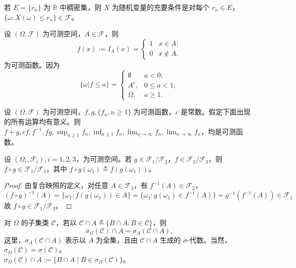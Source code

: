 \documentclass[lang=cn,10pt,thmcnt=section]{elegantbook}
\begin{document}
\begin{theorem}
	若 \(E = \{r_n\}\) 为 \(\mathbb{R}\) 中稠密集，则 \(X\) 为随机变量的充要条件是对每个 \(r_n \in E\)，\(\{\omega : X(\omega) \leq r_n\} \in \mathscr{F}\)。
\end{theorem}
\begin{example}
	设 \((\Omega, \mathscr{F})\) 为可测空间，\(A \in \mathscr{F}\)，则
\[
f(x) := I_A(x) = 
\begin{cases} 
1 & x \in A; \\
0 & x \notin A.
\end{cases}
\]
为可测函数。因为
\[
\{\omega | f \leq a\} = 
\begin{cases} 
\emptyset & a < 0; \\
A^c, & 0 \leq a < 1; \\
\Omega, & a \geq 1.
\end{cases}
\]

\end{example}
\begin{theorem}\label{th:1.1.9}
	设 \((\Omega, \mathcal{F})\) 为可测空间，\(f, g, \{f_n, n \geq 1\}\) 为可测函数，\(c\) 是常数。假定下面出现的所有运算均有意义。则 \(f + g, cf, f^{-1}, fg, \sup_{n \geq 1} f_n, \inf_{n \geq 1} f_n,\underline{\lim_{n \to \infty}}  f_n, \overline{\lim_{n \to \infty}} f_n\)，均是可测函数。
\end{theorem}

\begin{theorem}
	设 \((\Omega_i, \mathscr{F}_i), i = 1, 2, 3\)，为可测空间。若 \(g \in \mathscr{F}_1/\mathscr{F}_2\)，\(f \in \mathscr{F}_2/\mathscr{F}_3\)，则 \(f \circ g \in \mathscr{F}_1/\mathscr{F}_3\)，其中 \(f \circ g(\omega_1) \triangleq f(g(\omega_1))\)。
\end{theorem}
\begin{proof}
	由复合映照的定义，对任意 \(A \in \mathscr{F}_3\)，有 \(f^{-1}(A) \in \mathscr{F}_2\)，
\[
(f \circ g)^{-1}(A) = \{\omega_1 : f(g(\omega_1)) \in A\}
= \{\omega_1 : g(\omega_1) \in f^{-1}(A)\}
= g^{-1}(f^{-1}(A)) \in \mathscr{F}_1
\]
故 \(f \circ g \in \mathscr{F}_1/\mathscr{F}_3\)。
\end{proof}
\begin{theorem}
	对 \(\Omega\) 的子集类 \(\mathscr{C}\)，若以 \(\mathscr{C} \cap A \triangleq \{B \cap A : B \in \mathscr{C}\}\)，则
	\[
	\sigma_\Omega(\mathscr{C}) \cap A = \sigma_A(\mathscr{C} \cap A),
	\]
	这里，\(\sigma_A(\mathscr{C} \cap A)\) 表示以 \(A\) 为全集，且由 \(\mathscr{C} \cap A\) 生成的 \(\sigma\)-代数。当然，\(\sigma_\Omega(\mathscr{C}) = \sigma(\mathscr{C})\)。\\
	\(\sigma_\Omega(\mathscr{C}) \cap A := \{B \cap A \mid B \in \sigma_\Omega(\mathscr{C})\}\)。
\end{theorem}
\end{document}
